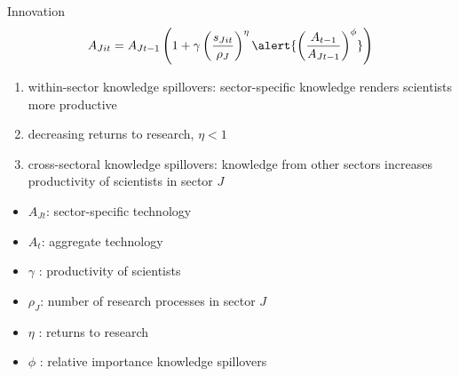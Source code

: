 \documentclass[11pt,aspectratio=169]{beamer}
\begin{document}
\addtocounter{framenumber}{-1}
\begin{frame}{Innovation}
	\vspace{-5mm}
	\large
	\begin{align*}
		A_{Jit}={A_{Jt-1}}\left(1+\gamma\left(\frac{s_{Jit}}{\rho_J}\right)^\eta\alert{\left(\frac{A_{t-1}}{A_{Jt-1}}\right)^\phi}\right)
	\end{align*}
	\normalsize
	\begin{enumerate}
		\item within-sector knowledge spillovers: sector-specific knowledge renders scientists more productive
		\item decreasing returns to research, $\eta<1$
		\item \alert{cross-sectoral knowledge spillovers: knowledge from other sectors increases productivity of scientists in sector $J$} %
	\end{enumerate}
	\small
	\vspace{4mm}
	\hspace{-2mm}
	\begin{minipage}[t!]{0.43\textwidth}
		\vspace{0mm}
		\begin{itemize}
			\item[] $A_{Jt}$: sector-specific technology
			\vspace{-2mm}		
			\item[] $A_t$: aggregate technology 
			\vspace{-2mm}
			\item[] $\gamma$ : productivity of scientists
		\end{itemize}
	\end{minipage}
	\vspace{-5mm}
	\begin{minipage}[t!]{0.55\textwidth}
		\vspace{0mm}
		\begin{itemize}	
			\item[] $\rho_J$: number of research processes in sector $J$
			\vspace{-2mm}			
			\item[] $\eta$ : returns to research
			\vspace{-2mm}			
			\item[] $\phi$ : relative importance knowledge spillovers
		\end{itemize}
	\end{minipage}
\end{frame}
\end{document}
